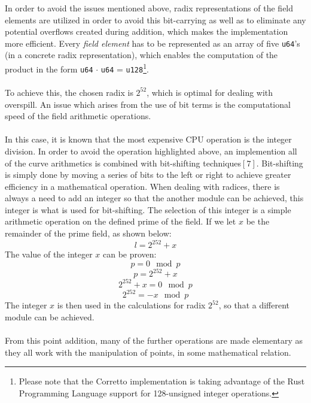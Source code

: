 \documentclass{article}
\begin{document}
In order to avoid the issues mentioned above, radix representations of the field elements are utilized in order to avoid this bit-carrying as well as to eliminate any potential overflows created during addition, which makes the implementation more efficient. Every \textit{field element} has to be represented as an array of five \texttt{u64}'s (in a concrete radix representation), which enables the computation of the product in the form \texttt{u64} $\cdot$ \texttt{u64} = \texttt{u128}\footnote{Please note that the Corretto implementation is taking advantage of the Rust Programming Language support for 128-unsigned integer operations.}.
\\\\
To achieve this, the chosen radix is $2^{52}$, which is optimal for dealing with overspill. An issue which arises from the use of bit terms is the computational speed of the field arithmetic operations. \\\\
In this case, it is known that the most expensive CPU operation is the integer division. In order to avoid the operation highlighted above, an implemention all of the curve arithmetics is combined with bit-shifting techniques$[7]$. Bit-shifting is simply done by moving a series of bits to the left or right to achieve greater efficiency in a mathematical operation. When dealing with radices, there is always a need to add an integer so that the another module can be achieved, this integer is what is used for bit-shifting. The selection of this integer is a simple arithmetic operation on the defined prime of the field. 
If we let $x$ be the remainder of the prime field, as shown below:
$$ l = 2^{252}+x $$
The value of the integer $x$ can be proven:
$$ p = 0\mod p$$  
$$ p = 2^{252}+x $$
$$ 2^{252}+x = 0\mod p $$
$$ 2^{252} = -x\mod p $$
The integer $x$ is then used in the calculations for radix $2^{52}$, so that a different module can be achieved. \\\\
From this point addition, many of the further operations are made elementary as they all work with the manipulation of points, in some mathematical relation.  


\newpage
\end{document}
